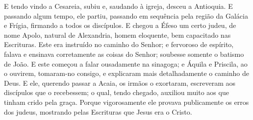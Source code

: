 {E tendo vindo a Cesareia, subiu e, saudando à igreja, desceu a Antioquia.
E passando
{} algum tempo, ele partiu, passando em sequência pela região da Galácia e Frígia, firmando a todos os discípulos.
E chegou a Éfeso um certo judeu, de nome Apolo, natural de Alexandria, homem eloquente, bem capacitado nas Escrituras.
Este era instruído no caminho do Senhor; e fervoroso de espírito, falava e ensinava corretamente as coisas do Senhor;
{} soubesse somente o batismo de João.
E este começou a falar ousadamente na sinagoga; e Áquila e Priscila, ao o ouvirem, tomaram-no consigo, e explicaram mais detalhadamente o caminho de Deus.
E ele, querendo passar a Acaia, os irmãos o exortaram,
{} escreveram aos discípulos que o recebessem; o qual, tendo chegado, auxiliou muito aos que tinham crido pela graça.
Porque vigorosamente ele provava publicamente os erros dos judeus, mostrando pelas Escrituras que Jesus era o Cristo.

}
